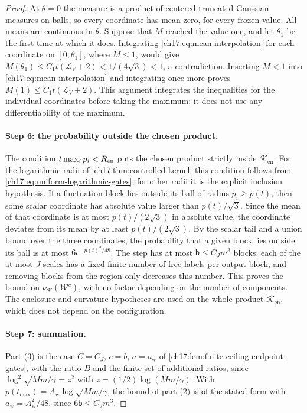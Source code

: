 \begin{proof}
At $\theta=0$ the measure is a product of centered truncated Gaussian measures on balls, so every coordinate has mean zero, for every frozen value. All means are continuous in $\theta$. Suppose that $M$ reached the value one, and let $\theta_1$ be the first time at which it does. Integrating \eqref{ch17:eq:mean-interpolation} for each coordinate on $[0,\theta_1]$, where $M\le1$, would give $M(\theta_1)\le C_1t(\mathcal L_V+2)<1/(4\sqrt3)<1$, a contradiction. Inserting $M<1$ into \eqref{ch17:eq:mean-interpolation} and integrating once more proves $M(1)\le C_1t(\mathcal L_V+2)$. This argument integrates the inequalities for the individual coordinates before taking the maximum; it does not use any differentiability of the maximum.

\paragraph{Step 6: the probability outside the chosen product.}
The condition $t\max_ip_i<R_{\mathrm{en}}$ puts the chosen product strictly inside $\mathcal K_{\mathrm{en}}$. For the logarithmic radii of \cref{ch17:thm:controlled-kernel} this condition follows from \eqref{ch17:eq:uniform-logarithmic-gates}; for other radii it is the explicit inclusion hypothesis. If a fluctuation block lies outside its ball of radius $p_i\ge p(t)$, then some scalar coordinate has absolute value larger than $p(t)/\sqrt3$. Since the mean of that coordinate is at most $p(t)/(2\sqrt3)$ in absolute value, the coordinate deviates from its mean by at least $p(t)/(2\sqrt3)$. By the scalar tail and a union bound over the three coordinates, the probability that a given block lies outside its ball is at most $6e^{-p(t)^2/48}$. The step has at most $\mathsf b\le C_Jm^3$ blocks: each of the at most $J$ scales has a fixed finite number of free labels per output block, and removing blocks from the region only decreases this number. This proves the bound on $\nu_{\mathcal K}(\mathcal W^c)$, with no factor depending on the number of components. The enclosure and curvature hypotheses are used on the whole product $\mathcal K_{\mathrm{en}}$, which does not depend on the configuration.

\paragraph{Step 7: summation.}
Part (3) is the case $C=C_J$, $c=b$, $a=a_{\mathrm w}$ of \cref{ch17:lem:finite-ceiling-endpoint-gates}, with the ratio $B$ and the finite set of additional ratios, since $\log^2\sqrt{Mm/\gamma}=z^2$ with $z=(1/2)\log(Mm/\gamma)$. With $p(t_{\max})=A_{\mathrm w}\log\sqrt{Mm/\gamma}$, the bound of part (2) is of the stated form with $a_{\mathrm w}=A_{\mathrm w}^2/48$, since $6\mathsf b\le C_Jm^3$.
\end{proof}

